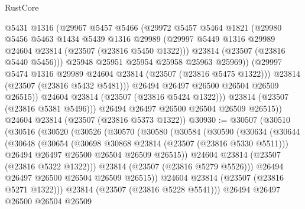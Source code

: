 \begin{lexlean}{RustCore}
\begin{coremodule}
                  @5431
                  @1316
                  (@29967
                    @5457
                    @5466
                    (@29972
                      @5457
                      @5464
                      @1821
                      (@29980
                        @5456
                        @5463
                        @1434
                        @5439
                        @1316
                        @29989
                        (@29997 @5449 @1316 @29989 @24604 @23814 (@23507 (@23816 @5450 @1322)))
                        @23814
                        (@23507 (@23816 @5440 @5456)))
                      @25948
                      @25951
                      @25954
                      @25958
                      @25963
                      @25969))
                  (@29997 @5474 @1316 @29989 @24604 @23814 (@23507 (@23816 @5475 @1322)))
                  @23814
                  (@23507 (@23816 @5432 @5481)))
                @26494
                @26497
                @26500
                @26504
                @26509
                @26515))
            @24604
            @23814
            (@23507 (@23816 @5424 @1322)))
          @23814
          (@23507 (@23816 @5381 @5496)))
        @26494
        @26497
        @26500
        @26504
        @26509
        @26515))
    @24604
    @23814
    (@23507 (@23816 @5373 @1322))
@30930 := @30507
    (@30510
      (@30516
        (@30520
          (@30526
            (@30570
              (@30580
                (@30584
                  (@30590
                    (@30634
                      (@30644
                        (@30648
                          (@30654
                            (@30698 @30868 @23814 (@23507 (@23816 @5330 @5511)))
                            @26494
                            @26497
                            @26500
                            @26504
                            @26509
                            @26515))
                        @24604
                        @23814
                        (@23507 (@23816 @5322 @1322)))
                      @23814
                      (@23507 (@23816 @5279 @5526)))
                    @26494
                    @26497
                    @26500
                    @26504
                    @26509
                    @26515))
                @24604
                @23814
                (@23507 (@23816 @5271 @1322)))
              @23814
              (@23507 (@23816 @5228 @5541)))
            @26494
            @26497
            @26500
            @26504
            @26509

\end{coremodule}
\end{lexlean}
